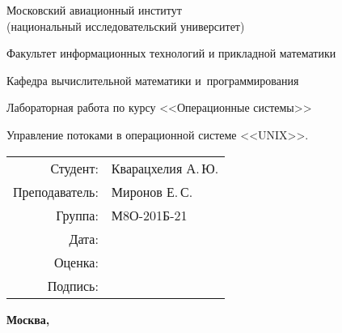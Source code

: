 \begin{titlepage}
	\begin{center}
		\bfseries
		
		{\Large Московский авиационный институт\\ (национальный исследовательский университет)}
		
		\vspace{48pt}
		
		{\large Факультет информационных технологий и прикладной математики}
		
		\vspace{36pt}
		
		{\large Кафедра вычислительной математики и~программирования}
		
		\vspace{48pt}
		
		Лабораторная работа  по курсу <<Операционные системы>>
		
		\vspace{48pt}
		
		Управление потоками в операционной системе <<UNIX>>.
		
	\end{center}
	
	\vspace{150pt}
	
	\begin{flushright}
		\begin{tabular}{rl}
			Студент: & Кварацхелия А.\,Ю. \\
			Преподаватель: & Миронов Е.\,С. \\
			Группа: & М8О-201Б-21 \\
			Дата: & \\
			Оценка: & \\
			Подпись: & \\
		\end{tabular}
	\end{flushright}
	
	\vfill
	
	\begin{center}
		\bfseries
		Москва, \the\year
	\end{center}
\end{titlepage}